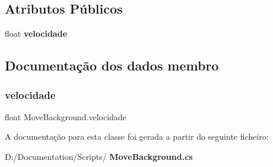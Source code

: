 \subsection*{Atributos Públicos}
\begin{DoxyCompactItemize}
\item 
float \textbf{ velocidade}
\end{DoxyCompactItemize}


\subsection{Documentação dos dados membro}
\mbox{\label{class_move_background_a2bc82388d7598f636d04217087ee5d22}} 
\subsubsection{velocidade}
{\footnotesize\ttfamily float Move\+Background.\+velocidade}



A documentação para esta classe foi gerada a partir do seguinte ficheiro\+:\begin{DoxyCompactItemize}
\item 
D\+:/\+Documentation/\+Scripts/\textbf{ Move\+Background.\+cs}\end{DoxyCompactItemize}
